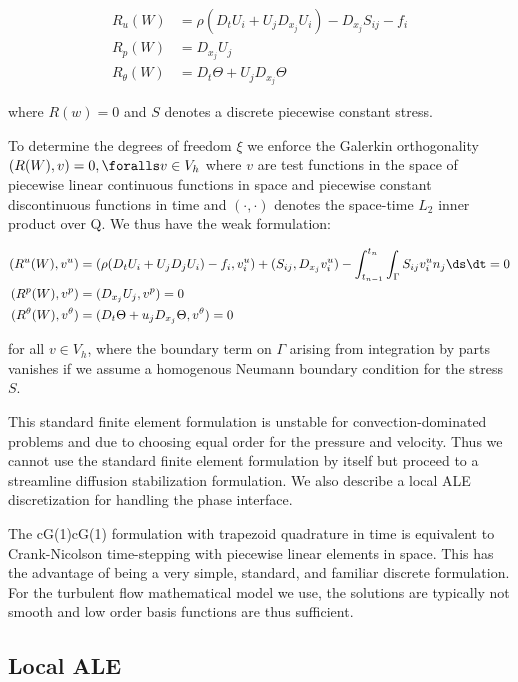 \begin{align}
  R_u(W) &= \rho(D_t U_i + U_j D_{x_j} U_i) - D_{x_j} S_{ij} - f_i\\
  R_p(W) &= D_{x_j} U_j\\
  R_\theta(W) &= D_t \Theta + U_j D_{x_j} \Theta
\end{align}

where $R(w) = 0$ and $S$ denotes a discrete piecewise constant
stress.

To determine the degrees of freedom $\xi$ we enforce the Galerkin
orthogonality $(R(W), v) = 0, \foralls v \in V_h$ where $v$ are test
functions in the space of piecewise linear continuous functions in
space and piecewise constant discontinuous functions in time and
$(\cdot,\cdot)$ denotes the space-time $L_2$ inner product over Q. We
thus have the weak formulation:

\begin{align}
  (R^u(W), v^u) &= (\rho(D_t U_i + U_j D_j U_i) - f_i, v^u_i) + (S_{ij}, D_{x_j} v^u_i) - \int_{t_{n-1}}^{t_n}\int_\Gamma S_{ij} v^u_i n_j \ds \dt = 0\\
  (R^p(W), v^p) &= (D_{x_j} U_j, v^p) = 0\\
  (R^\theta(W), v^\theta) &= (D_t \Theta + u_j D_{x_j} \Theta, v^\theta) = 0
\end{align}

for all $v \in V_h$, where the boundary term on $\Gamma$ arising from
integration by parts vanishes if we assume a homogenous Neumann
boundary condition for the stress $S$.

This standard finite element formulation is unstable for
convection-dominated problems and due to choosing equal order for the
pressure and velocity. Thus we cannot use the standard finite element
formulation by itself but proceed to a streamline diffusion
stabilization formulation. We also describe a local ALE discretization
for handling the phase interface.

The cG(1)cG(1) formulation with trapezoid quadrature in time is
equivalent to Crank-Nicolson time-stepping with piecewise linear
elements in space. This has the advantage of being a very simple,
standard, and familiar discrete formulation. For the turbulent flow
mathematical model we use, the solutions are typically not smooth and
low order basis functions are thus sufficient.

\subsection{Local ALE}

